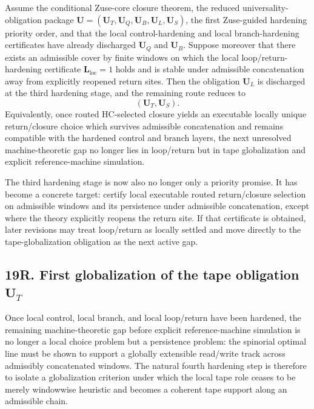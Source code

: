 \begin{proposition}
Assume the conditional Zuse-core closure theorem, the reduced universality-obligation package \(\mathbf U=(\mathbf U_T,\mathbf U_Q,\mathbf U_B,\mathbf U_L,\mathbf U_S)\), the first Zuse-guided hardening priority order, and that the local control-hardening and local branch-hardening certificates have already discharged \(\mathbf U_Q\) and \(\mathbf U_B\). Suppose moreover that there exists an admissible cover by finite windows on which the local loop/return-hardening certificate \(\mathbf L_{\mathrm{loc}}=1\) holds and is stable under admissible concatenation away from explicitly reopened return sites. Then the obligation \(\mathbf U_L\) is discharged at the third hardening stage, and the remaining route reduces to
\[
(\mathbf U_T,\mathbf U_S).
\]
Equivalently, once routed HC-selected closure yields an executable locally unique return/closure choice which survives admissible concatenation and remains compatible with the hardened control and branch layers, the next unresolved machine-theoretic gap no longer lies in loop/return but in tape globalization and explicit reference-machine simulation.
\end{proposition}

\begin{corollary}
The third hardening stage is now also no longer only a priority promise. It has become a concrete target: certify local executable routed return/closure selection on admissible windows and its persistence under admissible concatenation, except where the theory explicitly reopens the return site. If that certificate is obtained, later revisions may treat loop/return as locally settled and move directly to the tape-globalization obligation as the next active gap.
\end{corollary}


\subsection*{19R. First globalization of the tape obligation $\mathbf U_T$}
Once local control, local branch, and local loop/return have been hardened, the remaining machine-theoretic gap before explicit reference-machine simulation is no longer a local choice problem but a persistence problem: the spinorial optimal line must be shown to support a globally extensible read/write track across admissibly concatenated windows. The natural fourth hardening step is therefore to isolate a globalization criterion under which the local tape role ceases to be merely windowwise heuristic and becomes a coherent tape support along an admissible chain.


